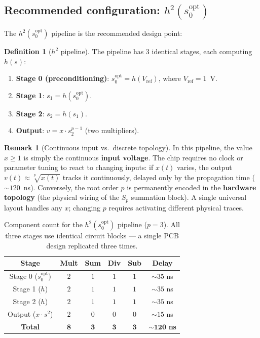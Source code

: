 \documentclass[11pt,a4paper]{article}
\theoremstyle{definition}
\newtheorem{definition}{Definition}[section]
\newtheorem{remark}{Remark}[section]
\newcommand{\prt}[2]{\sqrt[#1]{#2}}
\begin{document}
\subsection{Recommended configuration: \texorpdfstring{$h^2(s_0^{\mathrm{opt}})$}{h²(s0opt)}}

The $h^2(s_0^{\mathrm{opt}})$ pipeline is the recommended design point:

\begin{definition}[$h^2$ pipeline]
\label{def:h2_pipeline}
The pipeline has 3 identical stages, each computing $h(s)$:
\begin{enumerate}
  \item \textbf{Stage 0 (preconditioning)}: $s_0^{\mathrm{opt}} = h(V_{\text{ref}})$, where $V_{\text{ref}} = 1$~V.
  \item \textbf{Stage 1}: $s_1 = h(s_0^{\mathrm{opt}})$.
  \item \textbf{Stage 2}: $s_2 = h(s_1)$.
  \item \textbf{Output}: $v = x \cdot s_2^{p-1}$ (two multipliers).
\end{enumerate}
\end{definition}

\begin{remark}[Continuous input vs.\ discrete topology]
In this pipeline, the value $x \geq 1$ is simply the continuous \textbf{input voltage}. The chip requires no clock or parameter tuning to react to changing inputs: if $x(t)$ varies, the output $v(t) \approx \prt{p}{x(t)}$ tracks it continuously, delayed only by the propagation time ($\sim 120$~ns). Conversely, the root order $p$ is permanently encoded in the \textbf{hardware topology} (the physical wiring of the $S_p$ summation block). A single universal layout handles any $x$; changing $p$ requires activating different physical traces.
\end{remark}

\begin{table}[H]
\centering
\begin{tabular}{cccccc}
\toprule
\textbf{Stage} & \textbf{Mult} & \textbf{Sum} & \textbf{Div} & \textbf{Sub} & \textbf{Delay} \\
\midrule
Stage 0 ($s_0^{\mathrm{opt}}$) & $2$ & $1$ & $1$ & $1$ & $\sim 35$ ns \\
Stage 1 ($h$) & $2$ & $1$ & $1$ & $1$ & $\sim 35$ ns \\
Stage 2 ($h$) & $2$ & $1$ & $1$ & $1$ & $\sim 35$ ns \\
Output ($x \cdot s^2$) & $2$ & $0$ & $0$ & $0$ & $\sim 15$ ns \\
\midrule
\textbf{Total} & $\mathbf{8}$ & $\mathbf{3}$ & $\mathbf{3}$ & $\mathbf{3}$ & $\mathbf{\sim 120}$ \textbf{ns} \\
\bottomrule
\end{tabular}
\caption{Component count for the $h^2(s_0^{\mathrm{opt}})$ pipeline ($p=3$).  All three stages use identical circuit blocks --- a single PCB design replicated three times.}
\label{tab:h2_components}
\end{table}
\end{document}
